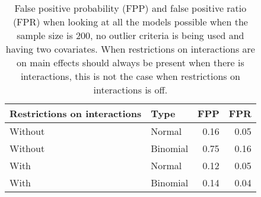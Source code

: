 \begin{longtable}{llrr}
\caption{False positive probability (FPP) and false positive ratio (FPR) when looking at all the models possible when the sample size is 200, no outlier criteria is being used and having two covariates. When restrictions on interactions are on main effects should always be present when there is interactions, this is not the case when restrictions on interactions is off.} \\ 
  \hline
Restrictions on interactions & Type & FPP & FPR \\ 
  \hline
Without & Normal & 0.16 & 0.05 \\ 
  Without & Binomial & 0.75 & 0.16 \\ 
  With & Normal & 0.12 & 0.05 \\ 
  With & Binomial & 0.14 & 0.04 \\ 
   \hline
\hline
\end{longtable}
